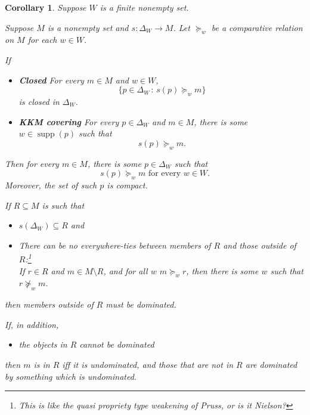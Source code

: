 \documentclass[11pt]{article}
\newtheorem{corollary}[theorem]{Corollary}
\theoremstyle{definition}
\theoremstyle{remark}
\newcommand{\supp}{\operatorname{supp}}
\newcommand{\given}{\,:\,}
\begin{document}
\begin{corollary}
	Suppose $W$ is a finite nonempty set.
	
	Suppose $M$ is a nonempty set and $s:\Delta_W\to M$.
	Let $\succeq_w$ be a comparative relation on $M$ for each $w\in W$.
	
	If
	\begin{itemize}
		\item \textbf{Closed} For every $m\in M$ and $w\in W$,
		\[
		\{p\in\Delta_W\given s(p)\succeq_w m\}
		\]
		is closed in $\Delta_W$.
		
		\item \textbf{KKM covering} For every $p\in\Delta_W$ and
		$m\in M$, there is some $w\in\supp(p)$ such that
		\[
		s(p)\succeq_w m.
		\]
	\end{itemize}
	Then for every $m\in M$, there is some $p\in\Delta_W$ such that
	\[
	s(p)\succeq_w m
	\text{ for every }w\in W.
	\]
	Moreover, the set of such $p$ is compact.
	
	If $R\subseteq M$ is such that
	\begin{itemize}
		\item $s(\Delta_W)\subseteq R$ and
		\item There can be no everywhere-ties between members of $R$
		and those outside of $R$:\footnote{This is like the quasi
			propriety type weakening of Pruss, or is it Nielson?} \\
		If $r\in R$ and $m\in M\setminus R$, and for all $w$
		$m\succeq_w r$, then there is some $w$ such that
		$r\not\succeq_w m$.
	\end{itemize}
	then members outside of $R$ must be dominated.
	
	If, in addition,
	\begin{itemize}
		\item the objects in $R$ cannot be dominated
	\end{itemize}
	then $m$ is in $R$ iff it is undominated, and those that are
	not in $R$ are dominated by something which is undominated.
\end{corollary}
\end{document}
